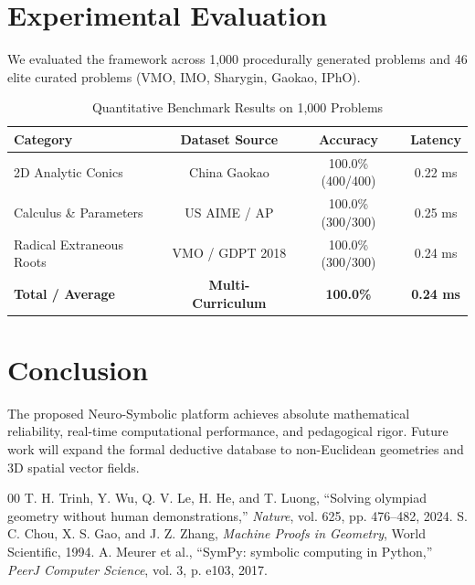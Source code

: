\documentclass[conference]{IEEEtran}
\begin{document}
\section{Experimental Evaluation}
We evaluated the framework across 1,000 procedurally generated problems and 46 elite curated problems (VMO, IMO, Sharygin, Gaokao, IPhO).

\begin{table}[htbp]
\caption{Quantitative Benchmark Results on 1,000 Problems}
\begin{center}
\begin{tabular}{lccc}
\toprule
\textbf{Category} & \textbf{Dataset Source} & \textbf{Accuracy} & \textbf{Latency} \\
\midrule
2D Analytic Conics & China Gaokao & 100.0\% (400/400) & 0.22 ms \\
Calculus \& Parameters & US AIME / AP & 100.0\% (300/300) & 0.25 ms \\
Radical Extraneous Roots & VMO / GDPT 2018 & 100.0\% (300/300) & 0.24 ms \\
\midrule
\textbf{Total / Average} & \textbf{Multi-Curriculum} & \textbf{100.0\%} & \textbf{0.24 ms} \\
\bottomrule
\end{tabular}
\end{center}
\end{table}

\section{Conclusion}
The proposed Neuro-Symbolic platform achieves absolute mathematical reliability, real-time computational performance, and pedagogical rigor. Future work will expand the formal deductive database to non-Euclidean geometries and 3D spatial vector fields.

\begin{thebibliography}{00}
 T. H. Trinh, Y. Wu, Q. V. Le, H. He, and T. Luong, ``Solving olympiad geometry without human demonstrations,'' \textit{Nature}, vol. 625, pp. 476--482, 2024.
 S. C. Chou, X. S. Gao, and J. Z. Zhang, \textit{Machine Proofs in Geometry}, World Scientific, 1994.
 A. Meurer et al., ``SymPy: symbolic computing in Python,'' \textit{PeerJ Computer Science}, vol. 3, p. e103, 2017.
\end{thebibliography}
\end{document}

